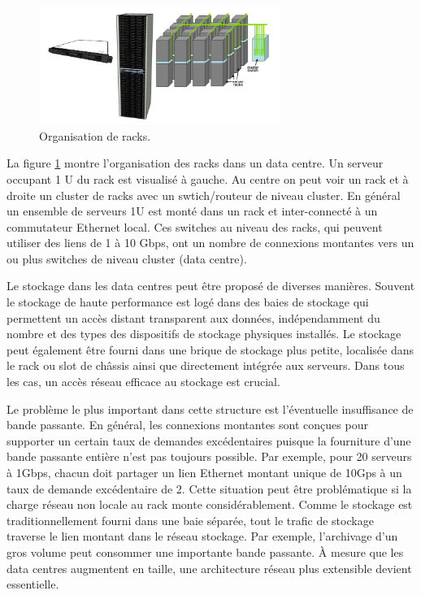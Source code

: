 \begin{figure}[h]
\begin{center}
\includegraphics[width=0.7\textwidth]{images/racks} 
\caption{Organisation de racks. \cite{datacenterAsComputerIntro}}\label{racks}
\end{center}
\end{figure}

La figure \ref{racks} montre l'organisation des racks dans un data centre. Un serveur occupant 1 U du rack est visualisé à gauche. Au centre on peut voir un rack et à droite un cluster de racks avec un swtich/routeur de niveau cluster. En général un ensemble de serveurs 1U est monté dans un rack et inter-connecté à un commutateur Ethernet local. Ces switches au niveau des racks, qui peuvent utiliser des liens de 1 à 10 Gbps, ont un nombre de connexions montantes vers un ou plus switches de niveau cluster (data centre).

Le stockage dans les data centres peut être proposé de diverses manières. Souvent le stockage de haute performance est logé dans des baies de stockage qui permettent un accès distant transparent aux données, indépendamment du nombre et des types des dispositifs de stockage physiques installés. Le stockage peut également être fourni dans une \og  brique de stockage \fg{} plus petite, localisée dans le rack ou slot de châssis ainsi que directement intégrée aux serveurs. Dans tous les cas, un accès réseau efficace au stockage est crucial.

Le problème le plus important dans cette structure est l'éventuelle insuffisance de bande passante. En général, les connexions montantes sont conçues pour supporter un certain taux de demandes excédentaires puisque la fourniture d'une bande passante entière n'est pas toujours possible. Par exemple, pour 20 serveurs à 1Gbps, chacun doit partager un lien Ethernet montant unique de 10Gps à un taux de demande excédentaire de 2. Cette situation peut être problématique si la charge réseau non locale au rack monte considérablement. Comme le stockage est traditionnellement fourni dans une baie séparée, tout le trafic de stockage traverse le lien montant dans le réseau stockage. Par exemple, l'archivage d'un gros volume peut consommer une importante bande passante. À mesure que les data centres augmentent en taille, une architecture réseau plus extensible devient essentielle.

